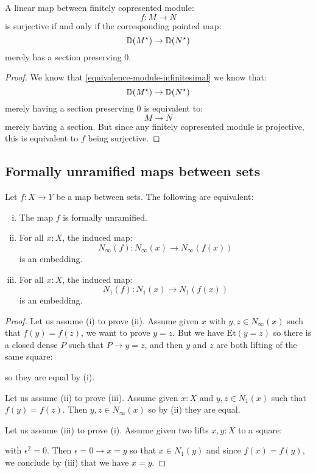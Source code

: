 \begin{lemma}\label{neighborhood-tangent-correspondence-smooth}
A linear map between finitely copresented module:
\[f:M\to N\]
is surjective if and only if the corresponding pointed map:
\[\mathbb{D}(M^\star) \to \mathbb{D}(N^\star)\]
merely has a section preserving $0$.
\end{lemma}

\begin{proof}
We know that \cref{equivalence-module-infinitesimal} we know that:
\[\mathbb{D}(M^\star) \to \mathbb{D}(N^\star)\]
merely having a section preserving $0$ is equivalent to:
\[M\to N\]
merely having a section. But since any finitely copresented module is projective, this is equivalent to $f$ being surjective.
\end{proof}

\subsection{Formally unramified maps between sets}

\begin{proposition}\label{unramified-sets-map}
Let $f:X\to Y$ be a map between sets. The following are equivalent:
\begin{enumerate}[(i)]
\item The map $f$ is formally unramified.
\item For all $x:X$, the induced map:
\[N_\infty(f) : N_\infty(x)\to N_\infty(f(x))\]
is an embedding.
\item For all $x:X$, the induced map:
\[N_1(f) : N_1(x)\to N_1(f(x))\]
is an embedding.
\end{enumerate}
\end{proposition}

\begin{proof}
Let us assume (i) to prove (ii). Assume given $x$ with $y,z\in N_\infty(x)$ such that $f(y)=f(z)$, we want to prove $y=z$. But we have $\mathrm{Et}(y=z)$ so there is a closed dense $P$ such that $P\to y=z$, and then $y$ and $z$ are both lifting of the same square: 
 \begin{center}
    \end{center}
so they are equal by (i). 

Let us assume (ii) to prove (iii). Assume given $x:X$ and $y,z\in N_1(x)$ such that $f(y)=f(z)$. Then $y,z\in N_\infty(x)$ so by (ii) they are equal.

Let us assume (iii) to prove (i). Assume given two lifts $x,y:X$ to a square:
 \begin{center}
    \end{center}
    with $\epsilon^2=0$. Then $\epsilon=0 \to x=y$ so that $x\in N_1(y)$ and since $f(x)=f(y)$, we conclude by (iii) that we have $x=y$.
\end{proof}

